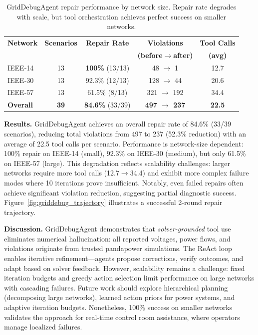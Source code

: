 \begin{table}[ht]
\centering
\caption{GridDebugAgent repair performance by network size. Repair rate degrades with scale, but tool orchestration achieves perfect success on smaller networks.}
\label{tab:griddebug_results}
\small
\begin{tabular}{@{}lcccc@{}}
\toprule
\textbf{Network} & \textbf{Scenarios} & \textbf{Repair Rate} & \textbf{Violations} & \textbf{Tool Calls} \\
 &  &  & \textbf{(before$\to$after)} & \textbf{(avg)} \\
\midrule
IEEE-14 & 13 & \textbf{100\%} (13/13) & 48 $\to$ 1 & 12.7 \\
IEEE-30 & 13 & 92.3\% (12/13) & 128 $\to$ 44 & 20.6 \\
IEEE-57 & 13 & 61.5\% (8/13) & 321 $\to$ 192 & 34.4 \\
\midrule
\textbf{Overall} & \textbf{39} & \textbf{84.6\%} (33/39) & \textbf{497 $\to$ 237} & \textbf{22.5} \\
\bottomrule
\end{tabular}
\end{table}

\textbf{Results.}
GridDebugAgent achieves an overall repair rate of 84.6\% (33/39 scenarios), reducing total violations from 497 to 237 (52.3\% reduction) with an average of 22.5 tool calls per scenario. Performance is network-size dependent: 100\% repair on IEEE-14 (small), 92.3\% on IEEE-30 (medium), but only 61.5\% on IEEE-57 (large). This degradation reflects scalability challenges: larger networks require more tool calls (12.7$\to$34.4) and exhibit more complex failure modes where 10 iterations prove insufficient. Notably, even failed repairs often achieve significant violation reduction, suggesting partial diagnostic success. Figure~\ref{fig:griddebug_trajectory} illustrates a successful 2-round repair trajectory.



\textbf{Discussion.}
GridDebugAgent demonstrates that \textit{solver-grounded} tool use eliminates numerical hallucination: all reported voltages, power flows, and violations originate from trusted pandapower simulations. The ReAct loop enables iterative refinement---agents propose corrections, verify outcomes, and adapt based on solver feedback. However, scalability remains a challenge: fixed iteration budgets and greedy action selection limit performance on large networks with cascading failures. Future work should explore hierarchical planning (decomposing large networks), learned action priors for power systems, and adaptive iteration budgets. Nonetheless, 100\% success on smaller networks validates the approach for real-time control room assistance, where operators manage localized failures.

% 
